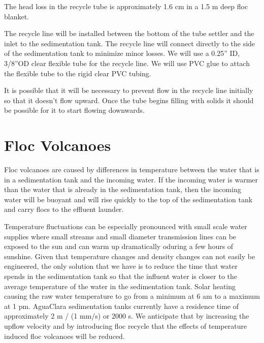 \documentclass[letterpaper,10pt,english]{sphinxmanual}
\begin{document}
The head loss in the recycle tube is approximately 1.6 cm in a 1.5 m deep floc blanket.

The recycle line will be installed between the bottom of the tube settler and the inlet to the sedimentation tank. The recycle line will connect  directly to the side of the sedimentation tank to minimize minor losses. We will use a 0.25” ID, 3/8”OD clear flexible tube for the recycle line. We will use PVC glue to attach the flexible tube to the rigid clear PVC tubing.

It is possible that it will be necessary to prevent flow in the recycle line initially so that it doesn’t flow upward. Once the tube begins filling with solids it should be possible for it to start flowing downwards.


\section{Floc Volcanoes}
\label{\detokenize{Sedimentation/Sed_Theory_and_Future_Work:floc-volcanoes}}\label{\detokenize{Sedimentation/Sed_Theory_and_Future_Work:id3}}
Floc volcanoes are caused by differences in temperature between the water that is in a sedimentation tank and the incoming water. If the incoming water is warmer than the water that is already in the sedimentation tank, then the incoming water will be buoyant and will rise quickly to the top of the sedimentation tank and carry flocs to the effluent launder.

Temperature fluctuations can be especially pronounced with small scale water supplies where small streams and small diameter transmission lines can be exposed to the sun and can warm up dramatically oduring a few hours of sunshine. Given that temperature changes and density changes can not easily be engineered, the only solution that we have is to reduce the time that water spends in the sedimentation tank so that the influent water is closer to the average temperature of the water in the sedimentation tank. Solar heating causing the raw water temperature to go from a minimum at 6 am to a maximum at 1 pm. AguaClara sedimentation tanks currently have a residence time of approximately 2 m / (1 mm/s) or 2000 s. We anticipate that by increasing the upflow velocity and by introducing floc recycle that the effects of temperature induced floc volcanoes will be reduced.
\end{document}
